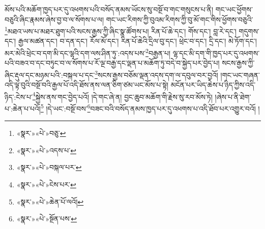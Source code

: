 མོས་པའི་མཆོག་ཁྱད་པར་དུ་འཕགས་པའི་བསོད་ནམས་ཡོངས་སུ་བསྔོ་བ་གང་གསུངས་པ་ནི། གང་ཡང་ཕྱོགས་བཅུའི་ཞིང་རྣམས་ཞེས་བྱ་བ་ལ་སོགས་པ་ལ། གང་ཡང་རིགས་ཀྱི་བུའམ་རིགས་ཀྱི་བུ་མོ་གང་གིས་ཕྱོགས་བཅུའི་\footnote{«སྣར་»«པེ་»བཅུ་}མཐའ་ཡས་པ་མཐར་ཐུག་པའི་སངས་རྒྱས་ཀྱི་ཞིང་སྣ་ཚོགས་པ། རིན་པོ་ཆེ་དང་། གོས་དང་། བླ་རེ་དང་། གདུགས་དང་། རྒྱལ་མཚན་དང་། བ་དན་དང་། རོལ་མོ་དང་། རིན་པོ་ཆེའི་དྲིལ་བུ་དང་། ཕྲེང་བ་དང་། དྲི་དང་། མེ་ཏོག་དང་། མར་མེའི་ཕྲེང་བ་དག་མི་དང་ལྷའི་དག་ལས་ཤིན་ཏུ་:འདས་པས་\footnote{«སྣར་»«པེ་»འདས་པ་}བརྒྱན་པ། ལྷ་དང་མི་དག་གི་ཁྱད་པར་དུ་འཕགས་པའི་བཟའ་བ་དང་བཏུང་བ་ལ་སོགས་པ་རོ་ལྔ་བརྒྱ་དང་ལྡན་པ་མཆོག་ཏུ་བདེ་བ་སྐྱེད་པར་བྱེད་པ། སངས་རྒྱས་ཀྱི་ཞིང་རྡུལ་དང་མཉམ་པའི་:བསྐལ་པ་དང་\footnote{«སྣར་»«པེ་»བསྐལ་པར་}སངས་རྒྱས་བཅོམ་ལྡན་འདས་དག་ལ་དབུལ་བར་བྱའོ། །གང་ཡང་གཞན་འདི་ལྟ་བུའི་བསྔོ་བའི་རྒྱལ་པོ་འདི་ཐོས་ནས་ལན་ཅིག་ཙམ་ཡང་མོས་པ་སྟེ། མངོན་པར་ཡིད་ཆེས་པ་ཉིད་ཀྱིས་འདི་ཉིད་:ངེས་པ་\footnote{«སྣར་»«པེ་»ངེས་པར་}སྐྱེས་ནས་གང་བྱེད་པའོ། །དེ་གང་ཞེ་ན། བྱང་ཆུབ་མཆོག་གི་རྗེས་སུ་རབ་མོས་ཏེ། །ཞེས་པ་ནི་ཐེག་པ་:ཆེན་པ་པའོ།\footnote{«སྣར་»«པེ་»ཆེན་པོ་ལའོ།} །དེ་ཡང་:བསྔོ་བས་\footnote{«སྣར་»«པེ་»སྔོན་པས་}བཟང་བའི་བསོད་ནམས་ཁྱད་པར་དུ་འཕགས་པ་འདི་ཐོབ་པར་འགྱུར་བའོ། །
